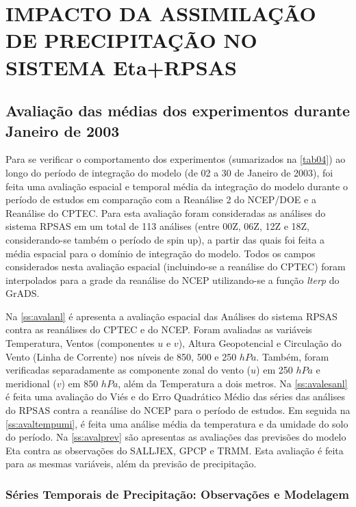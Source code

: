 \hypertarget{estilo:capitulo}{}
\chapter{IMPACTO DA ASSIMILAÇÃO DE PRECIPITAÇÃO NO SISTEMA Eta+RPSAS}
\label{ss:cap3}

\section{Avaliação das médias dos experimentos durante Janeiro de 2003}
\label{ss:avalmedia}

Para se verificar o comportamento dos experimentos (sumarizados na \autoref{tab04}) ao longo do período de integração do modelo (de 02 a 30 de Janeiro de 2003), foi feita uma avaliação espacial e temporal média da integração do modelo durante o período de estudos em comparação com a Reanálise 2 do NCEP/DOE e a Reanálise do CPTEC. Para esta avaliação foram consideradas as análises do sistema RPSAS em um total de 113 análises (entre 00Z, 06Z, 12Z e 18Z, considerando-se também  o período de spin up), a partir das quais foi feita a média espacial para o domínio de integração do modelo. Todos os campos considerados nesta avaliação espacial (incluindo-se a reanálise do CPTEC) foram interpolados para a grade da reanálise do NCEP utilizando-se a função \textit{lterp} do GrADS. 

Na \autoref{ss:avalanl} é apresenta a avaliação espacial das Análises do sistema RPSAS contra as reanálises do CPTEC e do NCEP. Foram avaliadas as variáveis Temperatura, Ventos (componentes $u$ e $v$), Altura Geopotencial e Circulação do Vento (Linha de Corrente) nos níveis de 850, 500 e 250 $hPa$. Também, foram verificadas separadamente as componente zonal do vento ($u$) em 250 $hPa$ e meridional ($v$) em 850 $hPa$, além da Temperatura a dois metros. Na \autoref{ss:avalesanl} é feita uma avaliação do Viés e do Erro Quadrático Médio das séries das análises do RPSAS contra a reanálise do NCEP para o período de estudos. Em seguida na \autoref{ss:avaltempumi}, é feita uma análise média da temperatura e da umidade do solo do período. Na \autoref{ss:avalprev} são apresentas as avaliações das previsões do modelo Eta contra as observações do SALLJEX, GPCP e TRMM. Esta avaliação é feita para as mesmas variáveis, além da previsão de precipitação.


\subsection{Séries Temporais de Precipitação: Observações e Modelagem}
\label{ss:precs}

